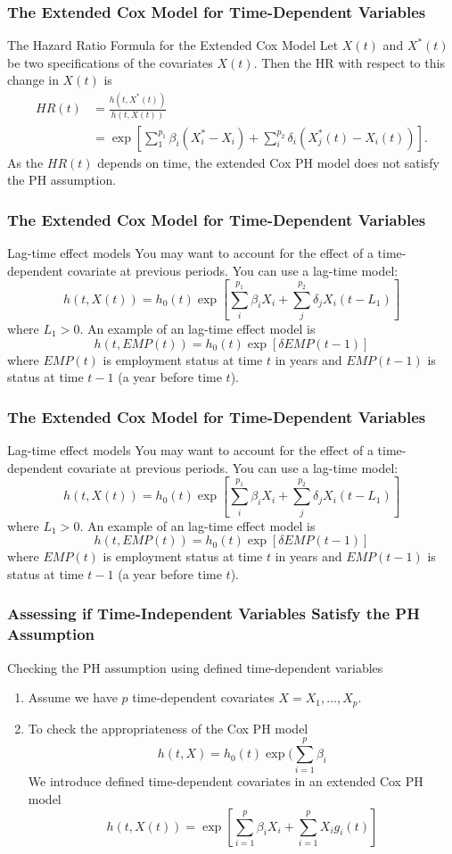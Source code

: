 \documentclass{beamer}
\theoremstyle{definition}
\begin{document}
\begin{frame}
\frametitle{The Extended Cox Model for Time-Dependent Variables}
\begin{block}{The Hazard Ratio Formula for the Extended Cox Model}
Let $X(t)$ and $X^*(t)$ be two specifications of the covariates $X(t)$. Then the HR with respect to this change in $X(t)$ is
\begin{align*}
HR(t) &= \frac{h(t,X^*(t))}{h(t,X(t))} \\
& = \exp\left[\sum_1^{p_1} \beta_i(X^*_i - X_i) + \sum_i^{p_2} \delta_i(X^*_j(t) - X_i(t))\right].
\end{align*}
As the $HR(t)$ depends on time, the extended Cox PH model does not satisfy the PH assumption.
\end{block}
\end{frame}


\begin{frame}
\frametitle{The Extended Cox Model for Time-Dependent Variables}
\begin{block}{Lag-time effect models}
You may want to account for the effect of a time-dependent covariate at previous periods. You can use a lag-time model:
\[
h(t,X(t)) = h_0(t) \exp\left[\sum_i^{p_1} \beta_i X_i + \sum_j^{p_2} \delta_j X_i(t-L_1)\right]
\]
where $L_1>0$.
An example of an lag-time effect model is
\[
h(t,EMP(t)) = h_0(t)\exp[\delta EMP(t-1)]
\]
where $EMP(t)$ is employment status at time $t$ in years and $EMP(t-1)$ is status at time $t-1$ (a year before time $t$).
\end{block}
\end{frame}

\begin{frame}
\frametitle{The Extended Cox Model for Time-Dependent Variables}
\begin{block}{Lag-time effect models}
You may want to account for the effect of a time-dependent covariate at previous periods. You can use a lag-time model:
\[
h(t,X(t)) = h_0(t) \exp\left[\sum_i^{p_1} \beta_i X_i + \sum_j^{p_2} \delta_j X_i(t-L_1)\right]
\]
where $L_1>0$.
An example of an lag-time effect model is
\[
h(t,EMP(t)) = h_0(t)\exp[\delta EMP(t-1)]
\]
where $EMP(t)$ is employment status at time $t$ in years and $EMP(t-1)$ is status at time $t-1$ (a year before time $t$).
\end{block}
\end{frame}

\begin{frame}
\frametitle{Assessing if Time-Independent Variables Satisfy the PH Assumption}
\begin{block}{Checking the PH assumption using defined time-dependent variables}
\begin{enumerate}
\item Assume we have $p$ time-dependent covariates $X=X_1,\ldots,X_p$.
\item To check the appropriateness of the Cox PH model
\[
h(t,X) = h_0(t)\exp(\sum_{i=1}^p \beta_i
\]
We introduce defined time-dependent covariates in an extended Cox PH model
\[
h(t,X(t)) = \exp[\sum_{i=1}^p \beta_i X_i + \sum_{i=1}^p X_i g_i(t)]
\]
\end{enumerate}
\end{block}
\end{frame}
\end{document}
